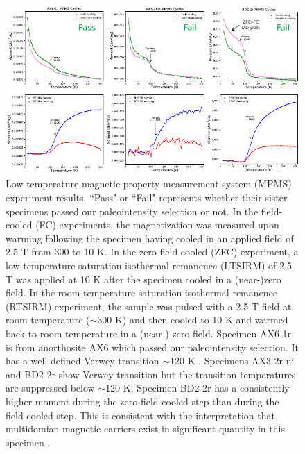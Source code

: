 \documentclass[9pt,twoside,lineno]{pnas-new}
\begin{document}
\clearpage

\begin{figure}
\noindent\includegraphics[width=\textwidth]{MPMS.pdf}
\centering
\caption{{Low-temperature magnetic property measurement system (MPMS) experiment results. ``Pass" or ``Fail" represents whether their sister specimens passed our paleointensity selection or not. In the field-cooled (FC) experiments, the magnetization was measured upon warming following the specimen having cooled in an applied field of 2.5 T from 300 to 10 K. In the zero-field-cooled (ZFC) experiment, a low-temperature saturation isothermal remanence (LTSIRM) of 2.5 T was applied at 10 K after the specimen cooled in a (near-)zero field. In the room-temperature saturation isothermal remanence (RTSIRM) experiment, the sample was pulsed with a 2.5 T field at room temperature ($\sim$300 K) and then cooled to 10 K and warmed back to room temperature in a (near-) zero field. Specimen AX6-1r is from anorthosite AX6 which passed our paleointensity selection. It has a well-defined Verwey transition $\sim$120 K \cite{Verwey1939a}. Specimens AX3-2r-ni and BD2-2r show Verwey transition but the transition temperatures are suppressed below $\sim$120 K. Specimen BD2-2r has a consistently higher moment during the zero-field-cooled step than during the field-cooled step. This is consistent with the interpretation that multidomian magnetic carriers exist in significant quantity in this specimen \cite{Carter-Stiglitz2006a}.}}
\label{fig:MPMS}
\end{figure}

\clearpage
\end{document}
